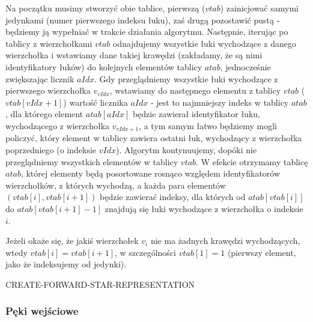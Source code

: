 Na początku musimy stworzyć obie tablice, pierwszą ($vtab$) zainicjować samymi jedynkami (numer pierwszego indeksu łuku), zaś drugą pozostawić pustą - będziemy ją wypełniać w trakcie działania algorytmu. Następnie, iterując po tablicy z wierzchołkami $vtab$ odnajdujemy wszystkie łuki wychodzące z danego wierzchołka i wstawiamy dane takiej krawędzi (zakładamy, że są nimi identyfikatory łuków) do kolejnych elementów tablicy $atab$, jednocześnie zwiększając licznik $aIdx$. Gdy przeglądniemy wszystkie łuki wychodzące z pierwszego wierzchołka $v_{vIdx}$, wstawiamy do następnego elementu z tablicy $vtab$ ($vtab \left[ vIdx+1 \right] $) wartość licznika $aIdx$ - jest to najmniejszy indeks w tablicy $atab$, dla którego element $atab \left[ aIdx \right] $ będzie zawierał identyfikator łuku, wychodzącego z wierzchołka $v_{vIdx+1}$, a tym samym łatwo będziemy mogli policzyć, który element w tablicy zawiera ostatni łuk, wychodzący z wierzchołka poprzedniego (o indeksie $vIdx$). Algorytm kontynuujemy, dopóki nie przeglądniemy wszystkich elementów w tablicy $vtab$. W efekcie otrzymamy tablicę $atab$, której elementy będą posortowane rosnąco względem identyfikatorów wierzchołków, z których wychodzą, a każda para elementów $ \left( vtab \left[ i \right] , vtab \left[ i+1 \right] \right) $ będzie zawierać indeksy, dla których od $atab \left[ vtab \left[ i \right] \right] $ do $atab \left[ vtab \left[ i+1 \right] -1 \right] $ znajdują się łuki wychodzące z wierzchołka o indeksie $i$.

Jeżeli okaże się, że jakiś wierzchołek $v_{i}$ nie ma żadnych krawędzi wychodzących, wtedy $vtab \left[ i \right] = vtab \left[ i+1 \right] $, w szczególności $vtab \left[ 1 \right] = 1$ (pierwszy element, jako że indeksujemy od jedynki).

\begin{algorithm}[!htbp]
\DontPrintSemicolon
{}
\caption{CREATE-FORWARD-STAR-REPRESENTATION\label{alg:cfsr}}
\end{algorithm}


\subsubsection{Pęki wejściowe}

